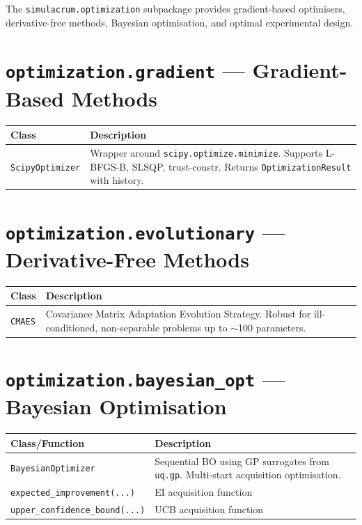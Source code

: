 \documentclass[11pt,a4paper]{report}
\begin{document}
The \texttt{simulacrum.optimization} subpackage provides gradient-based optimisers, derivative-free methods, Bayesian optimisation, and optimal experimental design.

\section{\texttt{optimization.gradient} --- Gradient-Based Methods}

\begin{longtable}{lp{8cm}}
\toprule
\textbf{Class} & \textbf{Description} \\
\midrule
\texttt{ScipyOptimizer} & Wrapper around \texttt{scipy.optimize.minimize}. Supports L-BFGS-B, SLSQP, trust-constr. Returns \texttt{OptimizationResult} with history. \\
\bottomrule
\end{longtable}

\section{\texttt{optimization.evolutionary} --- Derivative-Free Methods}

\begin{longtable}{lp{8cm}}
\toprule
\textbf{Class} & \textbf{Description} \\
\midrule
\texttt{CMAES} & Covariance Matrix Adaptation Evolution Strategy. Robust for ill-conditioned, non-separable problems up to $\sim$100 parameters. \\
\bottomrule
\end{longtable}

\section{\texttt{optimization.bayesian\_opt} --- Bayesian Optimisation}

\begin{longtable}{lp{8cm}}
\toprule
\textbf{Class/Function} & \textbf{Description} \\
\midrule
\texttt{BayesianOptimizer} & Sequential BO using GP surrogates from \texttt{uq.gp}. Multi-start acquisition optimisation. \\
\texttt{expected\_improvement(...)} & EI acquisition function \\
\texttt{upper\_confidence\_bound(...)} & UCB acquisition function \\
\bottomrule
\end{longtable}
\end{document}
